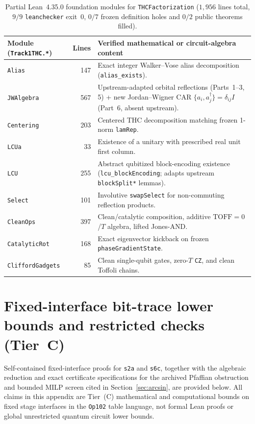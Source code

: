 \documentclass[11pt,a4paper]{article}
\newcommand{\RA}{\raggedright\arraybackslash}
\theoremstyle{definition}
\theoremstyle{remark}
\begin{document}
\begin{table}[htbp]
\centering\small
\begin{tabular}{@{}lr>{\RA}p{9.2cm}@{}}
\toprule
Module (\texttt{Track1THC.*}) & Lines & Verified mathematical or circuit-algebra content \\
\midrule
\texttt{Alias}          & 147 & Exact integer Walker--Vose alias decomposition (\texttt{alias\_exists}). \\
\texttt{JWAlgebra}      & 567 & Upstream-adapted orbital reflections (Parts~1--3, 5) + new Jordan--Wigner CAR \(\{a_i, a_j^\dagger\} = \delta_{ij} I\) (Part~6, absent upstream). \\
\texttt{Centering}      & 203 & Centered THC decomposition matching frozen 1-norm \texttt{lamRep}. \\
\texttt{LCUa}           &  33 & Existence of a unitary with prescribed real unit first column. \\
\texttt{LCU}            & 255 & Abstract qubitized block-encoding existence (\texttt{lcu\_blockEncoding}; adapts upstream \texttt{blockSplit*} lemmas). \\
\texttt{Select}         & 101 & Involutive \texttt{swapSelect} for non-commuting reflection products. \\
\texttt{CleanOps}       & 397 & Clean/catalytic composition, additive \(\mathrm{TOFF}=0\)/\(T\) algebra, lifted Jones-AND. \\
\texttt{CatalyticRot}   & 168 & Exact eigenvector kickback on frozen \texttt{phaseGradientState}. \\
\texttt{CliffordGadgets}&  85 & Clean single-qubit gates, zero-\(T\) \texttt{CZ}, and clean Toffoli chains. \\
\bottomrule
\end{tabular}
\caption{Partial Lean~4.35.0 foundation modules for \texttt{THC\allowbreak Factorization} (\(1{,}956\) lines total, \(9/9\) \texttt{leanchecker} exit~\(0\), \(0/7\) frozen definition holes and \(0/2\) public theorems filled).}
\label{tab:thc}
\end{table}

\FloatBarrier
\section{Fixed-interface bit-trace lower bounds and restricted checks (Tier~C)}
\label{app:degree}

Self-contained fixed-interface proofs for \texttt{s2a} and \texttt{s6c}, together with the algebraic reduction and exact certificate specifications for the archived Pfaffian obstruction and bounded MILP screen cited in Section~\ref{sec:arcsin}, are provided below. All claims in this appendix are Tier~(C) mathematical and computational bounds on fixed stage interfaces in the \texttt{Op102} table language, not formal Lean proofs or global unrestricted quantum circuit lower bounds.
\end{document}
